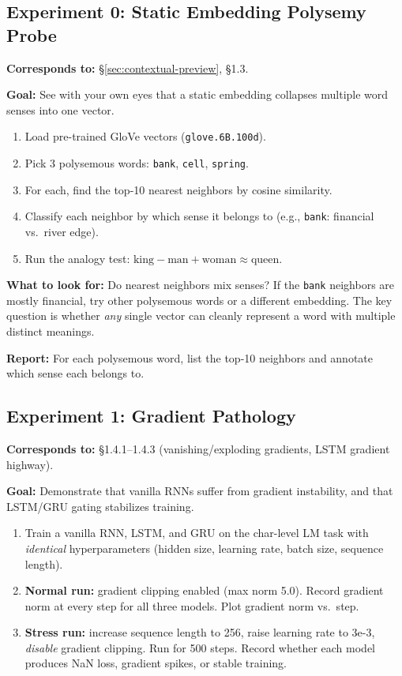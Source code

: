 \subsection*{Experiment 0: Static Embedding Polysemy Probe}

\textbf{Corresponds to:} \S\ref{sec:contextual-preview}, \S1.3.

\textbf{Goal:} See with your own eyes that a static embedding collapses multiple word senses into one vector.

\begin{enumerate}[nosep]
    \item Load pre-trained GloVe vectors (\texttt{glove.6B.100d}).
    \item Pick 3 polysemous words: \texttt{bank}, \texttt{cell}, \texttt{spring}.
    \item For each, find the top-10 nearest neighbors by cosine similarity.
    \item Classify each neighbor by which sense it belongs to (e.g., \texttt{bank}: financial vs.\ river edge).
    \item Run the analogy test: $\text{king} - \text{man} + \text{woman} \approx \text{queen}$.
\end{enumerate}

\textbf{What to look for:} Do nearest neighbors mix senses? If the \texttt{bank} neighbors are mostly financial, try other polysemous words or a different embedding. The key question is whether \emph{any} single vector can cleanly represent a word with multiple distinct meanings.

\textbf{Report:} For each polysemous word, list the top-10 neighbors and annotate which sense each belongs to.

\subsection*{Experiment 1: Gradient Pathology}

\textbf{Corresponds to:} \S1.4.1--1.4.3 (vanishing/exploding gradients, LSTM gradient highway).

\textbf{Goal:} Demonstrate that vanilla RNNs suffer from gradient instability, and that LSTM/GRU gating stabilizes training.

\begin{enumerate}[nosep]
    \item Train a vanilla RNN, LSTM, and GRU on the char-level LM task with \emph{identical} hyperparameters (hidden size, learning rate, batch size, sequence length).
    \item \textbf{Normal run:} gradient clipping enabled (max norm 5.0). Record gradient norm at every step for all three models. Plot gradient norm vs.\ step.
    \item \textbf{Stress run:} increase sequence length to 256, raise learning rate to 3e-3, \emph{disable} gradient clipping. Run for 500 steps. Record whether each model produces NaN loss, gradient spikes, or stable training.
\end{enumerate}


